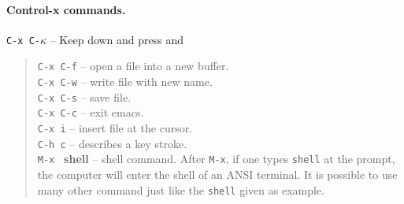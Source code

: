 \documentclass[a4paper,12pt]{book}
\begin{document}
\paragraph{Control-x commands.} \verb|C-x C-|$\kappa$ -- Keep 
down and press  and  \keys{$\kappa$}
\begin{quote}
\verb|C-x C-f| -- open a file into a new buffer.\\
\verb|C-x C-w| -- write file with new name.\\
\verb|C-x C-s| -- save file.\\
\verb|C-x C-c| -- exit emacs.\\
\verb|C-x i| -- insert file at the cursor.\\
\verb|C-h c| -- describes a key stroke.\\
\verb|M-x | {\bf shell} --  shell command. After \verb|M-x|,
if one types \verb|shell| at the prompt, the computer
will enter the shell of an ANSI terminal.
It is possible to use many other command
just like the \verb|shell| given as example.
\end{quote}
\end{document}
